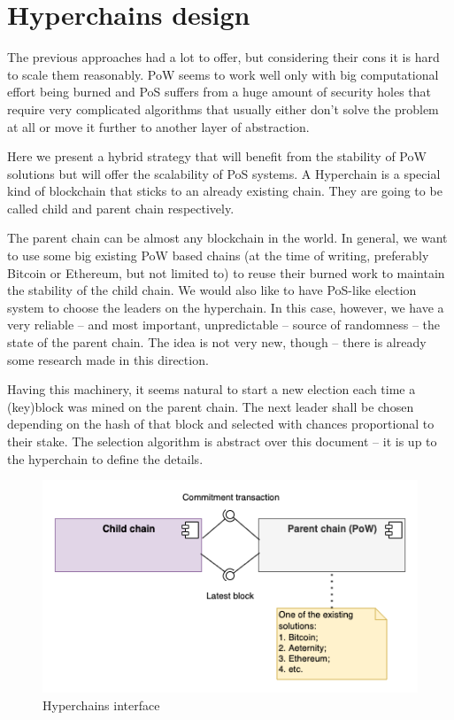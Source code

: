 \section{Hyperchains design}
\graphicspath{ {./images/} }

The previous approaches had a lot to offer, but considering their cons it is hard
to scale them reasonably. PoW seems to work well only with big
computational effort being burned and PoS suffers from a huge amount of security
holes that require very complicated algorithms that usually either don't solve
the problem at all or move it further to another layer of abstraction.

Here we present a hybrid strategy that will benefit from the stability of PoW
solutions but will offer the scalability of PoS systems. A Hyperchain is a
special kind of blockchain that sticks to an already existing chain. They are
going to be called child and parent chain respectively\cite{hyperchains}.

The parent chain can be almost any blockchain in the world. In general, we want
to use some big existing PoW based chains (at the time of writing, preferably
Bitcoin or Ethereum, but not limited to) to reuse their burned work to maintain
the stability of the child chain. We would also like to have
PoS-like election system to choose the leaders on the hyperchain. In this case,
however, we have a very reliable – and most important, unpredictable – source
of randomness – the state of the parent chain. The idea is not very new,
though – there is already some research made in this direction\cite{blockchain_random}.

Having this machinery, it seems natural to start a new election each time a
(key)block was mined on the parent chain. The next leader shall be chosen
depending on the hash of that block and selected with chances proportional to
their stake. The selection algorithm is abstract over this document – it is
up to the hyperchain to define the details.

\begin{figure}[b]
     \caption{Hyperchains interface}
     \centering
     \includegraphics[scale=0.5]{hyperchains_interface}
\end{figure}

